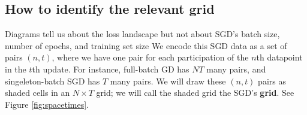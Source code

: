 \documentclass[anon,12pt]{colt2021} %
\newtheorem*{rmk*}{Remark}
\newcommand{\wabs}[1]{\left|#1\right|}
\newcommand{\Aut}{\text{\textnormal{Aut}}}
\newcommand{\uvalue}{\text{\textnormal{uvalue}}}
\newcommand{\edges}{\text{\textnormal{edges}}}
\newcommand{\sizeddia}[2]{%
    \begin{gathered}%
        \texttt{[image: ../diagrams/\#1.png]}%
    \end{gathered}%
}
\newcommand{\sdia}[1]{\protect \sizeddia{#1}{0.10}}
\newcommand{\mend}{\hfill $\Diamond$}
\begin{document}
{    %


    \vfill
    \subsection{How to identify the relevant grid}            \label{appendix:draw-spacetime}

        Diagrams tell us about the loss landscape but not about
        SGD's batch size, number of epochs, and training set size
        We encode this SGD data as a set of pairs $(n,t)$, where we have
        one pair for each participation of the $n$th datapoint in the $t$th
        update.  For instance, full-batch GD has $NT$ many pairs, and
        singeleton-batch SGD has $T$ many pairs.  We will draw these
        $(n,t)$ pairs as shaded cells in an $N\times T$ grid; we will call
        the shaded grid the SGD's \textbf{grid}.  See Figure
        \ref{fig:spacetimes}.  

}
\end{document}
